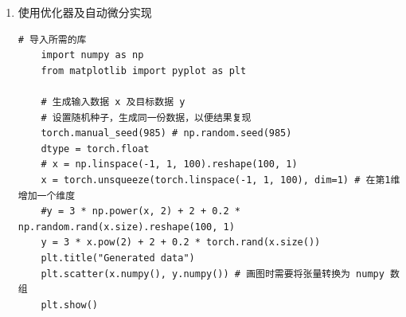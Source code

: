 \begin{enumerate}[label=\arabic*)]
\begin{lstlisting}[style=pythonstyle]
    # 2.训练模型
    lr = 0.01  # 学习率
    epochs = 1000  # 迭代次数
    for i in range(epochs):
        # 1)前向传播
        y_pred = x.pow(2).mm(w1) + x.mm(w2) + b  # 使用 PyTorch 矩阵乘法
    
        # 2)计算损失
        loss = 0.5 * (y_pred - y).pow(2).sum()  # 使用 PyTorch 的张量操作计算损失
        # loss = (0.5 * (y_pred - y) ** 2).mean()
    
        # 3)反向传播
        loss.backward()  # 自动计算梯度
    
        # 4)更新参数,使用梯度下降法使得损失函数最小
        with torch.no_grad():
            w1 -= lr * w1.grad  # 更新权重
            w2 -= lr * w2.grad
            b -= lr * b.grad  # 更新偏置
            # 清零梯度
            w1.grad.zero_()
            w2.grad.zero_()
            b.grad.zero_()
    
        # 每100次迭代输出一次损失值
        if i % 100 == 0:
            print("epoch: {}, loss: {}".format(i, loss.item()))
            plt.scatter(x.numpy(), y.numpy())
            plt.plot(x.numpy(), y_pred.detach().numpy(), 'r-', label='predict')
            plt.title("Regression result")
            plt.legend()
            plt.show()
    
    print("w1: ", w1, "w2: ", w2, "b: ", b)
    \end{lstlisting}
    \begin{lstlisting}[style=demostyle,numbers=none]
    epoch: 0, loss: 386.6900939941406
    epoch: 100, loss: 1.4194867610931396
    epoch: 200, loss: 1.4194862842559814
    epoch: 300, loss: 1.4194862842559814
    epoch: 400, loss: 1.4194862842559814
    epoch: 500, loss: 1.4194862842559814
    epoch: 600, loss: 1.4194862842559814
    epoch: 700, loss: 1.4194862842559814
    epoch: 800, loss: 1.4194862842559814
    epoch: 900, loss: 1.4194862842559814
    w1:  tensor([[3.0083]], requires_grad=True) 
    w2:  tensor([[-0.0228]], requires_grad=True) 
    b:  tensor([[1.9803]], requires_grad=True)
    \end{lstlisting}
        
 
    \item 使用优化器及自动微分实现
    \begin{lstlisting}[style=pythonstyle]
    # 导入所需的库
    import numpy as np
    from matplotlib import pyplot as plt

    # 生成输入数据 x 及目标数据 y
    # 设置随机种子，生成同一份数据，以便结果复现
    torch.manual_seed(985) # np.random.seed(985)
    dtype = torch.float
    # x = np.linspace(-1, 1, 100).reshape(100, 1)
    x = torch.unsqueeze(torch.linspace(-1, 1, 100), dim=1) # 在第1维增加一个维度
    #y = 3 * np.power(x, 2) + 2 + 0.2 * np.random.rand(x.size).reshape(100, 1)
    y = 3 * x.pow(2) + 2 + 0.2 * torch.rand(x.size())
    plt.title("Generated data")
    plt.scatter(x.numpy(), y.numpy()) # 画图时需要将张量转换为 numpy 数组
    plt.show()


\end{lstlisting}
\end{enumerate}
